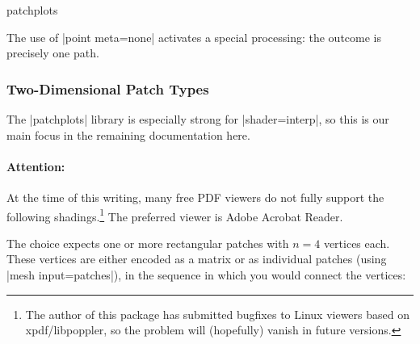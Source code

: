 {\begin{pgfplotslibrary}{patchplots}
\begin{codeexample}[]
\end{codeexample}
%
The use of |point meta=none| activates a special processing: the outcome is
precisely one path.


\subsubsection{Two-Dimensional Patch Types}
\label{sec:patchplots:twodim}

The |patchplots| library is especially strong for |shader=interp|, so this is
our main focus in the remaining documentation here.


\paragraph{Attention:}

At the time of this writing, many free PDF viewers do not fully support the
following shadings.\footnote{The author of this package has submitted bugfixes
to Linux viewers based on xpdf/libpoppler, so the problem will (hopefully)
vanish in future versions.} The preferred viewer is Adobe Acrobat Reader.

The choice  expects one or more rectangular patches with
$n=4$ vertices each. These vertices are either encoded as a matrix or as
individual patches (using |mesh input=patches|), in the sequence in which you
would connect the vertices:
%
\begin{codeexample}[]
\end{codeexample}


\end{pgfplotslibrary}}
